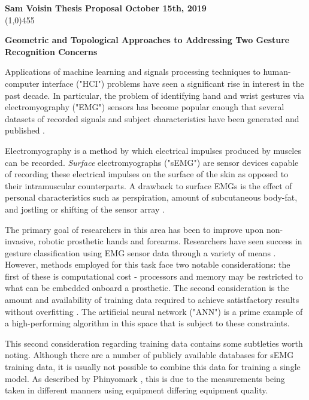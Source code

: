 \documentclass[11pt]{article}
\begin{document}
\noindent \textbf{Sam Voisin \hfill  \textbf{Thesis Proposal}  \hfill  October 15th, 2019} \\
\line(1,0){455}

\begin{center}
\Large{{\bf Geometric and Topological Approaches to Addressing Two Gesture Recognition Concerns}}\\
\end{center}

Applications of machine learning and signals processing techniques to human-computer interface ("HCI") problems have seen a significant rise in interest in the past decade. In particular, the problem of identifying hand and wrist gestures via electromyography ("EMG") sensors has become popular enough that several datasets of recorded signals and subject characteristics have been generated and published \cite{ninapro} \cite{lobov}.

Electromyography is a method by which electrical impulses produced by muscles can be recorded. \emph{Surface} electromyographs ("sEMG") are sensor devices capable of recording these electrical impulses on the surface of the skin as opposed to their intramuscular counterparts. A drawback to surface EMGs is the effect of personal characteristics such as perspiration, amount of subcutaneous body-fat, and jostling or shifting of the sensor array \cite{lobov}.

The primary goal of researchers in this area has been to improve upon non-invasive, robotic prosthetic hands and forearms. Researchers have seen success in gesture classification using EMG sensor data through a variety of means \cite{state}. However, methods employed for this task face two notable considerations: the first of these is computational cost - processors and memory may be restricted to what can be embedded onboard a prosthetic. The second consideration is the amount and availability of training data required to achieve satistfactory results without overfitting \cite{bigdata}. The artificial neural network ("ANN") is a prime example of a high-performing algorithm in this space that is subject to these constraints.

This second consideration regarding training data contains some subtleties worth noting. Although there are a number of publicly available databases for sEMG training data, it is usually not possible to combine this data for training a single model. As described by Phinyomark \cite{bigdata}, this is due to the measurements being taken in different manners using equipment differing equipment quality.
\end{document}
